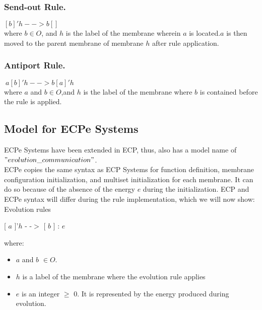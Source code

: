 \documentclass{acm_proc_article-sp}
\begin{document}
     \subsubsection*{Send-out Rule.}
        
\indent     $[b]'h --> b[]$ \\where $b \in O$, and $h$ is the label of the membrane wherein $a$ is located.$a$ is then moved to the parent membrane of membrane $h$ after rule application.
     \subsubsection*{Antiport Rule.}
        
\indent     $\ a[b]'h--> b[a]'h$ \\where $a$ and $b \in O$,and $h$ is the label of the membrane where $b$ is contained before the rule is applied.

\subsection{Model for ECPe Systems}
	\indent ECPe Systems have been extended in ECP, thus, also has a model name of $"evolution\_communication"$.\\
   
	\indent ECPe copies the same syntax as ECP Systems for function definition, membrane configuration initialization, and multiset initialization for each membrane. It can do so because of the absence of the energy $e$ during the initialization. ECP and ECPe syntax will differ during the rule implementation, which we will now show:  \\
    Evolution rules
    	\begin{center}
			[ $a$ ]'$h$ - -$>$ [ $b$ ] : $e$\\
		\end{center}            
            where: \\
        
         \begin{itemize}
			\item $a$ and $b$ $\in O.$
            \item $h$ is a label of the membrane where the evolution rule applies
            \item $e$ is an integer $\geq$ 0. It is represented by the energy produced during evolution.
		\end{itemize}
\end{document}
